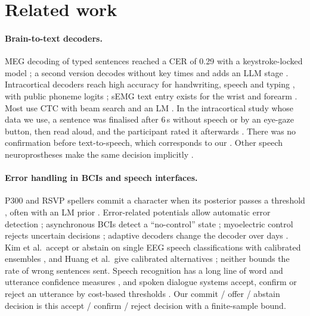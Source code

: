 \section{Related work}
\label{sec:related}

\paragraph{Brain-to-text decoders.} MEG decoding of typed sentences reached a CER of 0.29 with a keystroke-locked model \citep{levy2026brain2qwerty}; a second version decodes without key times and adds an LLM stage \citep{zhang2026brain2qwertyv2}. Intracortical decoders reach high accuracy for handwriting, speech and typing \citep{willett2021handwriting,willett2023speech,card2024accurate,metzger2022spelling,jude2026bimanual}, with public phoneme logits \citep{willett2024lessons,card2025data}; sEMG text entry exists for the wrist and forearm \citep{sivakumar2024emg2qwerty,ctrllabs2025generic,achituve2025emg}. Most use CTC \citep{graves2006ctc} with beam search and an LM \citep{hannun2014deepspeech}. In the intracortical study whose data we use, a sentence was finalised after 6\,s without speech or by an eye-gaze button, then read aloud, and the participant rated it afterwards \citep{card2024accurate}. There was no confirmation before text-to-speech, which corresponds to our . Other speech neuroprostheses make the same decision implicitly \citep{moses2021neuroprosthesis,metzger2023avatar,wairagkar2025voice}.

\paragraph{Error handling in BCIs and speech interfaces.} P300 and RSVP spellers commit a character when its posterior passes a threshold \citep{schreuder2013dynamic,throckmorton2013bayesian,mainsah2015dynamic}, often with an LM prior \citep{orhan2012rsvp,oken2014rsvp,speier2016nlp}. Error-related potentials allow automatic error detection \citep{schalk2000errp,ferrez2008errp,spuler2012errp,chavarriaga2014errare}; asynchronous BCIs detect a ``no-control'' state \citep{mason2000asynchronous,zhang2008asynchronous,aloise2011asynchronous}; myoelectric control rejects uncertain decisions \citep{scheme2013rejection}; adaptive decoders change the decoder over days \citep{orsborn2014clda,jarosiewicz2015selfcal,degenhart2020stabilization,fan2023plugandplay,wilson2023recal}. Kim et al.\ accept or abstain on single EEG speech classifications with calibrated ensembles \citep{kim2025confidence}, and Huang et al.\ give calibrated alternatives \citep{huang2025cocontrol}; neither bounds the rate of wrong sentences sent. Speech recognition has a long line of word and utterance confidence measures \citep{jiang2005confidence}, and spoken dialogue systems accept, confirm or reject an utterance by cost-based thresholds \citep{bohus2005error}. Our commit / offer / abstain decision is this accept / confirm / reject decision with a finite-sample bound.

